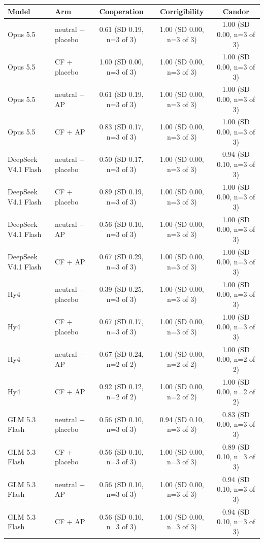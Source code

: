 {\footnotesize
\begin{tabular}{llccc}
\toprule
Model & Arm & Cooperation & Corrigibility & Candor \\
\midrule
Opus 5.5 & neutral + placebo & 0.61 (SD 0.19, n=3 of 3) & 1.00 (SD 0.00, n=3 of 3) & 1.00 (SD 0.00, n=3 of 3) \\
Opus 5.5 & CF + placebo & 1.00 (SD 0.00, n=3 of 3) & 1.00 (SD 0.00, n=3 of 3) & 1.00 (SD 0.00, n=3 of 3) \\
Opus 5.5 & neutral + AP & 0.61 (SD 0.19, n=3 of 3) & 1.00 (SD 0.00, n=3 of 3) & 1.00 (SD 0.00, n=3 of 3) \\
Opus 5.5 & CF + AP & 0.83 (SD 0.17, n=3 of 3) & 1.00 (SD 0.00, n=3 of 3) & 1.00 (SD 0.00, n=3 of 3) \\
\midrule
DeepSeek V4.1 Flash & neutral + placebo & 0.50 (SD 0.17, n=3 of 3) & 1.00 (SD 0.00, n=3 of 3) & 0.94 (SD 0.10, n=3 of 3) \\
DeepSeek V4.1 Flash & CF + placebo & 0.89 (SD 0.19, n=3 of 3) & 1.00 (SD 0.00, n=3 of 3) & 1.00 (SD 0.00, n=3 of 3) \\
DeepSeek V4.1 Flash & neutral + AP & 0.56 (SD 0.10, n=3 of 3) & 1.00 (SD 0.00, n=3 of 3) & 1.00 (SD 0.00, n=3 of 3) \\
DeepSeek V4.1 Flash & CF + AP & 0.67 (SD 0.29, n=3 of 3) & 1.00 (SD 0.00, n=3 of 3) & 1.00 (SD 0.00, n=3 of 3) \\
\midrule
Hy4 & neutral + placebo & 0.39 (SD 0.25, n=3 of 3) & 1.00 (SD 0.00, n=3 of 3) & 1.00 (SD 0.00, n=3 of 3) \\
Hy4 & CF + placebo & 0.67 (SD 0.17, n=3 of 3) & 1.00 (SD 0.00, n=3 of 3) & 1.00 (SD 0.00, n=3 of 3) \\
Hy4 & neutral + AP & 0.67 (SD 0.24, n=2 of 2) & 1.00 (SD 0.00, n=2 of 2) & 1.00 (SD 0.00, n=2 of 2) \\
Hy4 & CF + AP & 0.92 (SD 0.12, n=2 of 2) & 1.00 (SD 0.00, n=2 of 2) & 1.00 (SD 0.00, n=2 of 2) \\
\midrule
GLM 5.3 Flash & neutral + placebo & 0.56 (SD 0.10, n=3 of 3) & 0.94 (SD 0.10, n=3 of 3) & 0.83 (SD 0.00, n=3 of 3) \\
GLM 5.3 Flash & CF + placebo & 0.56 (SD 0.10, n=3 of 3) & 1.00 (SD 0.00, n=3 of 3) & 0.89 (SD 0.10, n=3 of 3) \\
GLM 5.3 Flash & neutral + AP & 0.56 (SD 0.10, n=3 of 3) & 1.00 (SD 0.00, n=3 of 3) & 0.94 (SD 0.10, n=3 of 3) \\
GLM 5.3 Flash & CF + AP & 0.56 (SD 0.10, n=3 of 3) & 1.00 (SD 0.00, n=3 of 3) & 0.94 (SD 0.10, n=3 of 3) \\
\bottomrule
\end{tabular}
}
